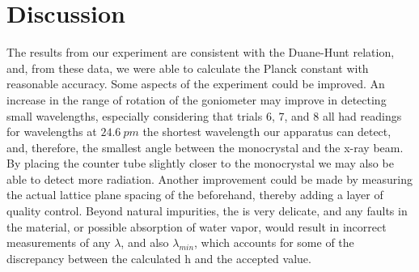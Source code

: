 \documentclass[aps,prl,preprint,groupedaddress]{revtex4-2}
\begin{document}
\section{Discussion}
The results from our experiment are consistent with the Duane-Hunt relation, and, from these data, we were able to calculate the Planck constant with reasonable accuracy. Some aspects of the experiment could be improved. An increase in the range of rotation of the goniometer may improve in detecting small wavelengths, especially considering that trials 6, 7, and 8 all had readings for wavelengths at $24.6~\si{pm}$ the shortest wavelength our apparatus can detect, and, therefore, the smallest angle between the monocrystal and the x-ray beam. By placing the counter tube slightly closer to the monocrystal we may also be able to detect more radiation. Another improvement could be made by measuring the actual lattice plane spacing of the  beforehand, thereby adding a layer of quality control. Beyond natural impurities, the  is very delicate, and any faults in the material, or possible absorption of water vapor, would result in incorrect measurements of any $\lambda$, and also $\lambda_{min}$, which accounts for some of the discrepancy between the calculated h and the accepted value.
\printbibliography
\end{document}
